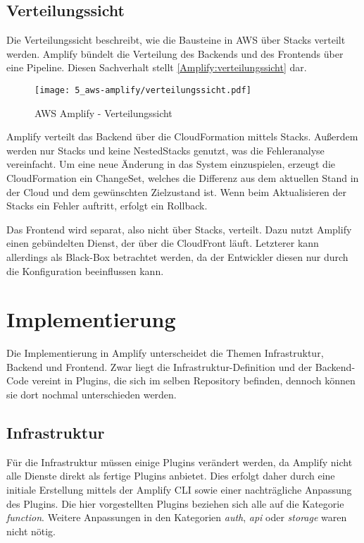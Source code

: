 \subsection{Verteilungssicht}

Die Verteilungssicht beschreibt, wie die Bausteine in \ac{AWS} über Stacks verteilt werden. Amplify bündelt die Verteilung des Backends und des Frontends über eine Pipeline. Diesen Sachverhalt stellt \autoref{Amplify:verteilungssicht} dar.

\begin{figure}
  \centering
  \texttt{[image: 5\_aws-amplify/verteilungssicht.pdf]}
  \caption{AWS Amplify - Verteilungssicht}
  \label{Amplify:verteilungssicht}
\end{figure}

Amplify verteilt das Backend über die CloudFormation mittels Stacks. Außerdem werden nur Stacks und keine NestedStacks genutzt, was die Fehleranalyse vereinfacht. Um eine neue Änderung in das System einzuspielen, erzeugt die CloudFormation ein ChangeSet, welches die Differenz aus dem aktuellen Stand in der Cloud und dem gewünschten Zielzustand ist. Wenn beim Aktualisieren der Stacks ein Fehler auftritt, erfolgt ein Rollback.

Das Frontend wird separat, also nicht über Stacks, verteilt. Dazu nutzt Amplify einen gebündelten Dienst, der über die CloudFront läuft. Letzterer kann allerdings als Black-Box betrachtet werden, da der Entwickler diesen nur durch die Konfiguration beeinflussen kann.

\section{Implementierung}

Die Implementierung in Amplify unterscheidet die Themen Infrastruktur, Backend und Frontend. Zwar liegt die Infrastruktur-Definition und der Backend-Code vereint in Plugins, die sich im selben Repository befinden, dennoch können sie dort nochmal unterschieden werden.

\subsection{Infrastruktur}

Für die Infrastruktur müssen einige Plugins verändert werden, da Amplify nicht alle Dienste direkt als fertige Plugins anbietet. Dies erfolgt daher durch eine initiale Erstellung mittels der Amplify CLI sowie einer nachträgliche Anpassung des Plugins. Die hier vorgestellten Plugins beziehen sich alle auf die Kategorie \textit{function}. Weitere Anpassungen in den Kategorien \textit{auth}, \textit{api} oder \textit{storage} waren nicht nötig.

